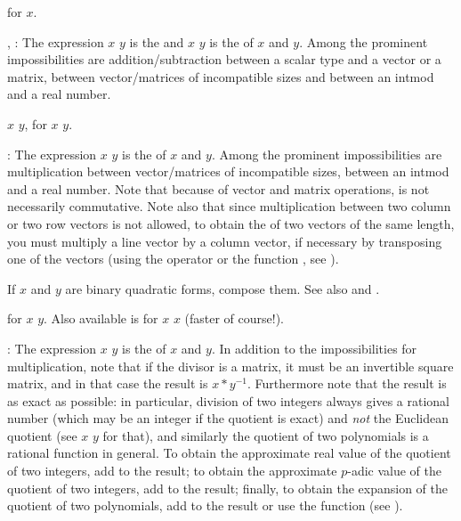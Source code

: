  for \kbd{-}$x$.

\subseckbd{+}, \kbd{-}: The expression $x$ \kbd{+} $y$ is the  and
$x$ \kbd{-} $y$ is the  of $x$ and $y$. Among the prominent
impossibilities are addition/subtraction between a scalar type and a vector
or a matrix, between vector/matrices of incompatible sizes and between an
intmod and a real number.

 $x$ \kbd{+} $y$,  for $x$ \kbd{-} $y$.

\subseckbd{*}: The expression $x$ \kbd{*} $y$ is the  of $x$
and $y$. Among the prominent impossibilities are multiplication between
vector/matrices of incompatible sizes, between an intmod and a real
number. Note that because of vector and matrix operations, \kbd{*} is not
necessarily commutative. Note also that since multiplication between two
column or two row vectors is not allowed, to obtain the 
of two vectors of the same length, you must multiply a line vector by a
column vector, if necessary by transposing one of the vectors (using
the operator \kbd{\til} or the function , see
).

If $x$ and $y$ are binary quadratic forms, compose them. See also
 and .

 for $x$ \kbd{*} $y$. Also available is
 for $x$ \kbd{*} $x$ (faster of course!).

\subseckbd{/}: The expression $x$ \kbd{/} $y$ is the  of $x$
and $y$. In addition to the impossibilities for multiplication, note that if
the divisor is a matrix, it must be an invertible square matrix, and in that
case the result is $x*y^{-1}$. Furthermore note that the result is as exact
as possible: in particular, division of two integers always gives a rational
number (which may be an integer if the quotient is exact) and \emph{not} the
Euclidean quotient (see $x$ \kbd{\bs} $y$ for that), and similarly the
quotient of two polynomials is a rational function in general. To obtain the
approximate real value of the quotient of two integers, add  to the
result; to obtain the approximate $p$-adic value of the quotient of two
integers, add  to the result; finally, to obtain the
 expansion of the quotient of two polynomials, add
 to the result or use the  function
(see ). \label{se:gdiv}

